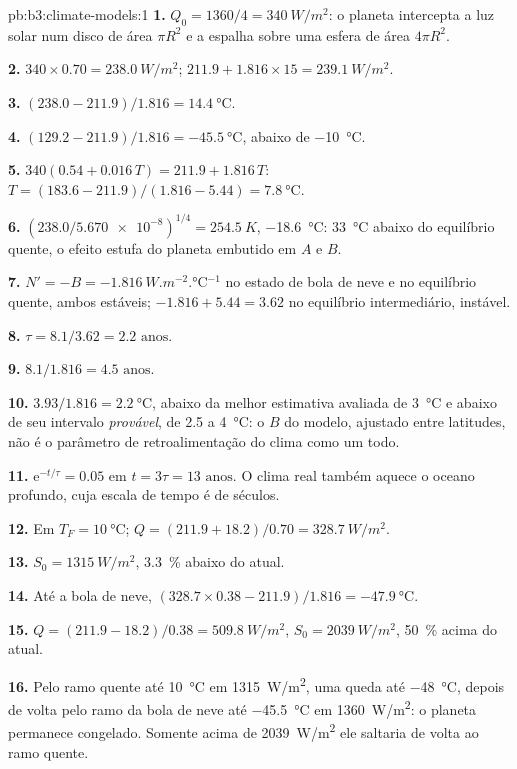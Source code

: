\begin{solution}{pb:b3:climate-models:1}
\textbf{1.} $Q_0 = 1360/4 = \qty{340}{W/m^2}$: o planeta intercepta a
luz solar num disco de área $\pi R^2$ e a espalha sobre uma esfera de área
$4\pi R^2$.

\textbf{2.} $340\times0.70 = \qty{238.0}{W/m^2}$; $211.9 + 1.816\times15 =
\qty{239.1}{W/m^2}$.

\textbf{3.} $(238.0 - 211.9)/1.816 = \qty{14.4}{\celsius}$.

\textbf{4.} $(129.2 - 211.9)/1.816 = \qty{-45.5}{\celsius}$, abaixo de
\qty{-10}{\celsius}.

\textbf{5.} $340(0.54 + 0.016\,T) = 211.9 + 1.816\,T$: $T =
(183.6 - 211.9)/(1.816 - 5.44) = \qty{7.8}{\celsius}$.

\textbf{6.} $(238.0/\num{5.670e-8})^{1/4} = \qty{254.5}{K}$,
\qty{-18.6}{\celsius}: \qty{33}{\celsius} abaixo do equilíbrio quente, o
efeito estufa do planeta embutido em $A$ e $B$.

\textbf{7.} $N' = -B = \qty{-1.816}{W.m^{-2}.\celsius^{-1}}$ no
estado de bola de neve e no equilíbrio quente, ambos estáveis; $-1.816 + 5.44 =
\num{+3.62}$ no equilíbrio intermediário, instável.

\textbf{8.} $\tau = 8.1/3.62 = \num{2.2}\text{ anos}$.

\textbf{9.} $8.1/1.816 = \num{4.5}\text{ anos}$.

\textbf{10.} $3.93/1.816 = \qty{2.2}{\celsius}$, abaixo da melhor
estimativa avaliada de \qty{3}{\celsius} e abaixo de seu intervalo \emph{provável}, de 2.5 a
\qty{4}{\celsius}: o $B$ do modelo, ajustado entre latitudes, não é
o parâmetro de retroalimentação do clima como um todo.

\textbf{11.} $\mathrm e^{-t/\tau} = 0.05$ em $t = 3\tau =
\num{13}\text{ anos}$. O clima real também aquece o oceano profundo, cuja escala de
tempo é de séculos.

\textbf{12.} Em $T_F = \qty{10}{\celsius}$; $Q = (211.9 + 18.2)/0.70 =
\qty{328.7}{W/m^2}$.

\textbf{13.} $S_0 = \qty{1315}{W/m^2}$, \qty{3.3}{\percent} abaixo do atual.

\textbf{14.} Até a bola de neve, $(328.7\times0.38 - 211.9)/1.816 =
\qty{-47.9}{\celsius}$.

\textbf{15.} $Q = (211.9 - 18.2)/0.38 = \qty{509.8}{W/m^2}$, $S_0 =
\qty{2039}{W/m^2}$, \qty{50}{\percent} acima do atual.

\textbf{16.} Pelo ramo quente até \qty{10}{\celsius} em
\qty{1315}{W/m^2}, uma queda até \qty{-48}{\celsius}, depois de volta pelo
ramo da bola de neve até \qty{-45.5}{\celsius} em \qty{1360}{W/m^2}: o planeta
permanece congelado. Somente acima de \qty{2039}{W/m^2} ele saltaria de volta ao
ramo quente.


\end{solution}
